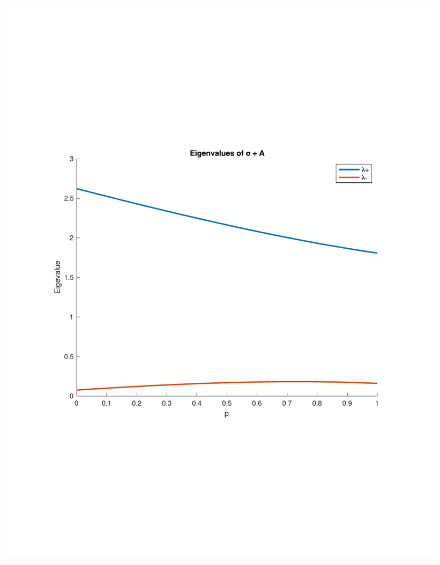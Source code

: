 \documentclass{article}
\begin{document}
\begin{enumerate}
\begin{enumerate}
			\begin{figure}[H]
				\centering
				\includegraphics[scale=0.4]{img/eigs.pdf}
			\end{figure}


\end{enumerate}
\end{enumerate}
\end{document}
